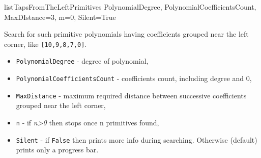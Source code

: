  {listTapsFromTheLeftPrimitives} {PolynomialDegree, PolynomialCoefficientsCount, MaxDIstance=3, m=0, Silent=True} {
	Search for such primitive polynomials having coefficients grouped near the left corner, like \texttt{[10,9,8,7,0]}.
	\begin{itemize}
		\item \texttt{PolynomialDegree} - degree of polynomial,
		\item \texttt{PolynomialCoefficientsCount} - coefficients count, including degree and 0,
		\item \texttt{MaxDistance} - maximum required distance between successive coefficients grouped near the left corner,
		\item \texttt{n} - if \textit{n>0} then stops once n primitives found,
		\item \texttt{Silent} - if \texttt{False} then prints more info during searching. Otherwise (default) prints only a progress bar.
	\end{itemize}
}

